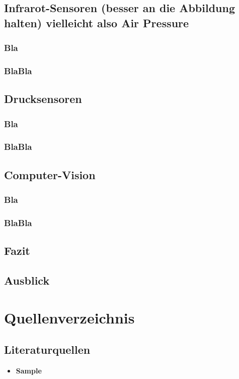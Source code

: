 \subsection{Infrarot-Sensoren (besser an die Abbildung halten) vielleicht also Air Pressure}
\subsubsection{Bla}
\subsubsection{BlaBla}
\subsection{Drucksensoren}
\subsubsection{Bla}
\subsubsection{BlaBla}
\subsection{Computer-Vision}
\subsubsection{Bla}
\subsubsection{BlaBla}

\subsection{Fazit}

\subsection{Ausblick}

\newpage

\section{Quellenverzeichnis}
\subsection*{Literaturquellen}
\begin{itemize}[leftmargin=*]
\item[] \textbf{Sample}
\end{itemize}
